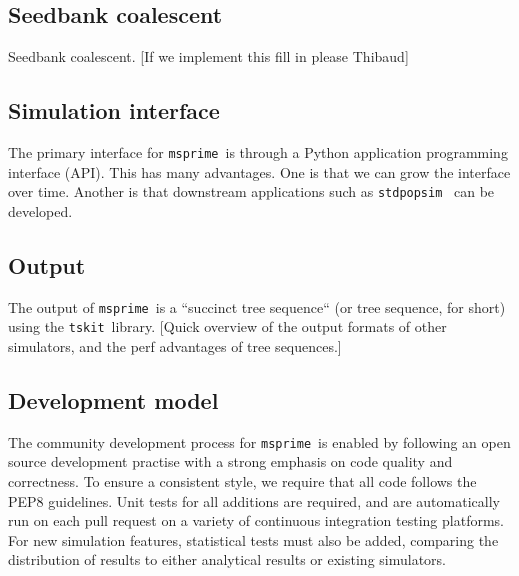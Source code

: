 \documentclass{article}
\newcommand{\msprime}[0]{\texttt{msprime}}
\newcommand{\tskit}[0]{\texttt{tskit}}
\begin{document}
\subsection*{Seedbank coalescent}
Seedbank coalescent. [If we implement this fill in please Thibaud]

\subsection*{Simulation interface}
The primary interface for \msprime\ is through a Python application
programming interface (API). This has many advantages. One is
that we can grow the interface over time. Another is that
downstream applications such as \texttt{stdpopsim}~\citep{adrion2019community}
can be developed.

\subsection*{Output}
The output of \msprime\ is a ``succinct tree sequence`` (or tree sequence,
for short) using the \tskit\ library. [Quick overview of the output formats
of other simulators, and the perf advantages of tree sequences.]

\subsection*{Development model}
The community development process for \msprime\ is enabled by following an
open source development practise with a strong emphasis on code quality
and correctness. To ensure a consistent style, we require that all code
follows the PEP8 guidelines. Unit tests for all additions are required, and
are automatically run on each pull request on a variety of continuous
integration testing platforms. For new simulation features, statistical tests
must also be added, comparing the distribution of results to either analytical
results or existing simulators.
\end{document}
